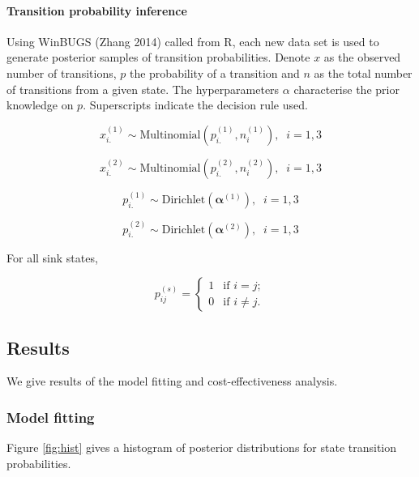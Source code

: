 \documentclass[
]{article}
\begin{document}
\hypertarget{transition-probability-inference}{%
\paragraph{Transition probability inference}\label{transition-probability-inference}}

Using WinBUGS (Zhang 2014) called from R, each new data set is used to generate posterior samples of transition probabilities.
Denote \(x\) as the observed number of transitions, \(p\) the probability of a transition and \(n\) as the total number of transitions from a given state.
The hyperparameters \(\alpha\) characterise the prior knowledge on \(p\).
Superscripts indicate the decision rule used.

\[x^{(1)}_{i.} \sim \mbox{Multinomial}(p^{(1)}_{i.}, n^{(1)}_i), \;\; i = 1,3\]

\[x^{(2)}_{i.} \sim \mbox{Multinomial}(p^{(2)}_{i.}, n^{(2)}_i), \;\; i = 1,3\]

\[p^{(1)}_{i.} \sim \mbox{Dirichlet}(\boldsymbol{\alpha}^{(1)} ), \;\; i = 1,3\]

\[p^{(2)}_{i.} \sim \mbox{Dirichlet}(\boldsymbol{\alpha}^{(2)} ), \;\; i = 1,3\]

For all sink states,

\[
p^{(s)}_{ij} = \left\{
\begin{array}{ll}
1 & \mbox{if $i = j$};\\
0 & \mbox{if $i \neq j$}.
\end{array} \right.
\]

\hypertarget{results}{%
\subsection{Results}\label{results}}

We give results of the model fitting and cost-effectiveness analysis.

\hypertarget{model-fitting}{%
\subsubsection{Model fitting}\label{model-fitting}}

Figure \ref{fig:hist} gives a histogram of posterior distributions for state transition probabilities.
\end{document}
